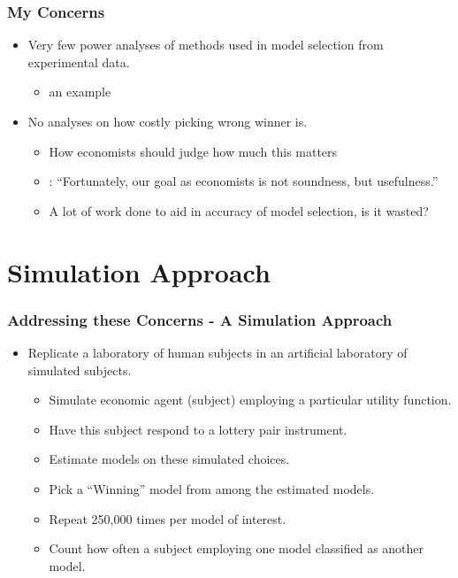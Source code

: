 \documentclass{beamer}
\begin{document}
\begin{frame}
\frametitle{My Concerns}
\begin{itemize}
	\item Very few power analyses of methods used in model selection from experimental data.
		\begin{itemize}
			\item \textcite{Wilcox2015} an example
		\end{itemize}
	\item No analyses on how costly picking wrong winner is.
		\begin{itemize}
			\item How economists should judge how much this matters
			\item \textcite[25]{Leamer2012}: \enquote{Fortunately, our goal as economists is not soundness, but usefulness.}
			\item A lot of work done to aid in accuracy of model selection, is it wasted?
		\end{itemize}
\end{itemize}
\end{frame}

\section{Simulation Approach}

\begin{frame}
\frametitle{Addressing these Concerns - A Simulation Approach}
\begin{itemize}
	\item Replicate a laboratory of human subjects in an artificial laboratory of simulated subjects.
		\begin{itemize}
			\item Simulate economic agent (subject) employing a particular utility function.
			\item Have this subject respond to a lottery pair instrument.
			\item Estimate models on these simulated choices.
			\item Pick a \enquote{Winning} model from among the estimated models.
			\item Repeat 250,000 times per model of interest.
			\item Count how often a subject employing one model classified as another model.
		\end{itemize}
\end{itemize}
\end{frame}
\end{document}
